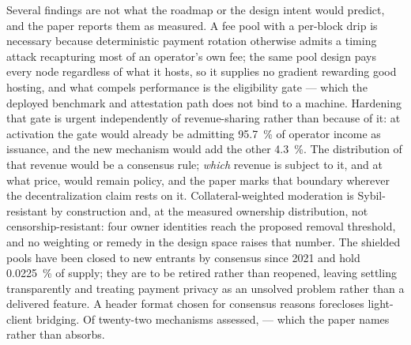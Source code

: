 Several findings are not what the roadmap or the design intent would predict, and the paper reports
them as measured. A fee pool with a per-block drip is necessary because deterministic payment
rotation otherwise admits a timing attack recapturing most of an operator's own fee; the same pool
design pays every node regardless of what it hosts, so it supplies no gradient rewarding good
hosting, and what compels performance is the eligibility gate --- which the deployed benchmark and
attestation path does not bind to a machine. Hardening that gate is urgent independently of
revenue-sharing rather than because of it: at activation the gate would already be admitting
\SI{95.7}{\percent} of operator income as issuance, and the new mechanism would add the other
\SI{4.3}{\percent}. The distribution of that revenue would be a consensus rule;
\emph{which} revenue is subject to it, and at what price, would remain policy, and the paper marks
that boundary wherever the decentralization claim rests on it. Collateral-weighted moderation is Sybil-resistant by construction and, at the
measured ownership distribution, not censorship-resistant: four owner identities reach the proposed
removal threshold, and no weighting or remedy in the design space raises that number. The shielded
pools have been closed to new entrants by consensus since 2021 and hold \SI{0.0225}{\percent} of
supply; they are to be retired rather than reopened, leaving \Flux{} settling transparently and
treating payment privacy as an unsolved problem rather than a delivered feature. A header format chosen for consensus reasons forecloses light-client
bridging. Of twenty-two mechanisms assessed, 
--- which the paper names rather than absorbs.

